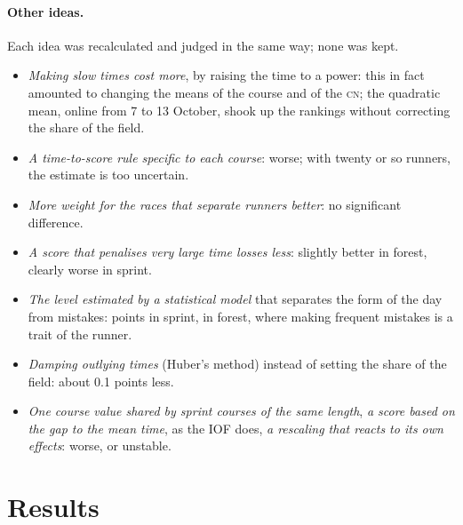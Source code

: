 \documentclass[11pt,a4paper]{article}
\newcommand{\CN}{\textsc{cn}}
\begin{document}
\paragraph{Other ideas.} Each idea was recalculated and judged in the same way; none was kept.
\begin{itemize}
  \item \emph{Making slow times cost more}, by raising the time to a power: this in fact amounted to changing the means of the course and of the \CN; the quadratic mean, online from 7 to 13 October, shook up the rankings without correcting the share of the field.
  \item \emph{A time-to-score rule specific to each course}: worse; with twenty or so runners, the estimate is too uncertain.
  \item \emph{More weight for the races that separate runners better}: no significant difference.
  \item \emph{A score that penalises very large time losses less}: slightly better in forest, clearly worse in sprint.
  \item \emph{The level estimated by a statistical model} that separates the form of the day from mistakes: \NmleS{} points in sprint, \NmleF{} in forest, where making frequent mistakes is a trait of the runner.
  \item \emph{Damping outlying times} (Huber's method) instead of setting the share of the field: about 0.1 points less.
  \item \emph{One course value shared by sprint courses of the same length}, \emph{a score based on the gap to the mean time}, as the IOF does, \emph{a rescaling that reacts to its own effects}: worse, or unstable.
\end{itemize}

\section{Results}
\end{document}
